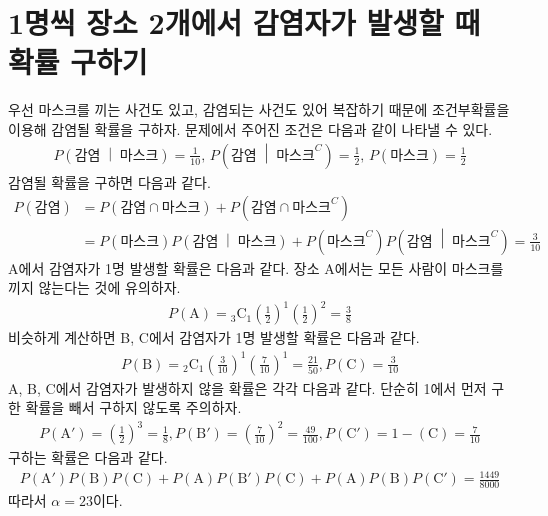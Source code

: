 \documentclass{scrartcl}
\title{\doctitle}
\author{Project Eclipse (19092 손량)}
\date{Last compiled on: \today, \currenttime}
\newcommand{\combi}[2]{{}_{#1}\mathrm{C}_{#2}}
\newcommand{\condprob}[2]{P\left({#1}\;\middle|\;{#2}\right)}
\begin{document}
\maketitle

\section{1명씩 장소 2개에서 감염자가 발생할 때 확률 구하기}
우선 마스크를 끼는 사건도 있고, 감염되는 사건도 있어 복잡하기 때문에 조건부확률을 이용해 감염될 확률을 구하자. 문제에서 주어진 조건은 다음과 같이 나타낼 수 있다.
\begin{align*}
  \condprob{\text{감염}}{\text{마스크}}=\frac{1}{10},\,\condprob{\text{감염}}{\text{마스크}^C}=\frac{1}{2},\,P\left(\text{마스크}\right)=\frac{1}{2}
\end{align*}
감염될 확률을 구하면 다음과 같다.
\begin{align*}
  P\left( \text{감염} \right)&=P\left( \text{감염}\cap\text{마스크} \right)+P\left( \text{감염}\cap\text{마스크}^C \right) \\
  &=P\left(\text{마스크}\right)\condprob{\text{감염}}{\text{마스크}}+P\left(\text{마스크}^C\right)\condprob{\text{감염}}{\text{마스크}^C}=\frac{3}{10}
\end{align*}
A에서 감염자가 1명 발생할 확률은 다음과 같다. 장소 A에서는 모든 사람이 마스크를 끼지 않는다는 것에 유의하자.
\begin{align*}
  P(\mathrm{A})=\combi{3}{1}\left( \frac{1}{2} \right)^1\left( \frac{1}{2} \right)^2=\frac{3}{8}
\end{align*}
비슷하게 계산하면 B, C에서 감염자가 1명 발생할 확률은 다음과 같다.
\begin{align*}
  P(\mathrm{B})=\combi{2}{1}\left( \frac{3}{10} \right)^1\left( \frac{7}{10} \right)^1=\frac{21}{50}, P(\mathrm{C})=\frac{3}{10}
\end{align*}
A, B, C에서 감염자가 발생하지 않을 확률은 각각 다음과 같다. 단순히 1에서 먼저 구한 확률을 빼서 구하지 않도록 주의하자.
\begin{align*}
  P(\mathrm{A}')=\left( \frac{1}{2} \right)^3=\frac{1}{8}, P(\mathrm{B}')=\left( \frac{7}{10} \right)^2=\frac{49}{100}, P(\mathrm{C}')=1-(\mathrm{C})=\frac{7}{10}
\end{align*}
구하는 확률은 다음과 같다.
\begin{align*}
  P(\mathrm{A}')P(\mathrm{B})P(\mathrm{C})+P(\mathrm{A})P(\mathrm{B}')P(\mathrm{C})+P(\mathrm{A})P(\mathrm{B})P(\mathrm{C}')=\frac{1449}{8000}
\end{align*}
따라서 \(\alpha=23\)이다.
\end{document}
